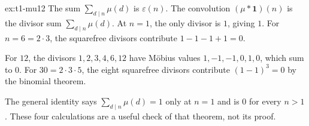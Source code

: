 \begin{solution}{ex:t1-mu12}
\idea The sum $\sum_{d\mid n}\mu(d)$ is $\varepsilon(n)$.
\writeup The convolution $(\mu*\mathbf1)(n)$ is the divisor sum $\sum_{d\mid n}\mu(d)$. At $n=1$, the only divisor is $1$, giving $1$. For $n=6=2\cdot3$, the squarefree divisors contribute
$1-1-1+1=0$.

For $12$, the divisors $1,2,3,4,6,12$ have M\"obius values $1,-1,-1,0,1,0$, which sum to $0$. For $30=2\cdot3\cdot5$, the eight squarefree divisors contribute $(1-1)^3=0$ by the binomial theorem.

The general identity says $\sum_{d\mid n}\mu(d)=1$ only at $n=1$ and is $0$ for every $n>1$. These four calculations are a useful check of that theorem, not its proof.
\end{solution}

